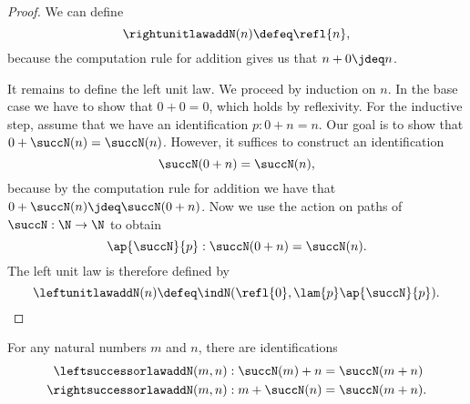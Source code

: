 \begin{proof}
  We can define
  \begin{equation*}
    \rightunitlawaddN(n)\defeq\refl{n},
  \end{equation*}
  because the computation rule for addition gives us that $n+0\jdeq n$.

  It remains to define the left unit law. We proceed by induction on $n$. In the base case we have to show that $0+0=0$, which holds by reflexivity. For the inductive step, assume that we have an identification $p:0+n=n$. Our goal is to show that $0+\succN(n)=\succN(n)$. However, it suffices to construct an identification
  \begin{equation*}
    \succN(0+n)=\succN(n),
  \end{equation*}
  because by the computation rule for addition we have that $0+\succN(n)\jdeq\succN(0+n)$. Now we use the action on paths of $\succN:\N\to\N$ to obtain
  \begin{equation*}
    \ap{\succN}{p}:\succN(0+n)=\succN(n).
  \end{equation*}
  The left unit law is therefore defined by
  \begin{equation*}
    \leftunitlawaddN(n)\defeq\indN(\refl{0},\lam{p}\ap{\succN}{p}).\qedhere
  \end{equation*}
\end{proof}

\begin{prp}\label{prp:successor-laws-add-N}
  For any natural numbers $m$ and $n$, there are identifications
  \begin{align*}
    \leftsuccessorlawaddN(m,n) & : \succN(m)+n=\succN(m+n) \\
    \rightsuccessorlawaddN(m,n) & : m+\succN(n)=\succN(m+n).
  \end{align*}
\end{prp}

